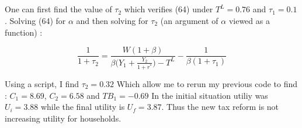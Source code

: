 \documentclass{article}
\begin{document}
\subsection{}
One can first find the value of $\tau_2$ which verifies (64) under $T^L = 0.76$ and $\tau_1 = 0.1$.
Solving (64) for $\alpha$ and then solving for $\tau_2$ (an argument of $\alpha$ viewed as a function) :

$$\frac{1}{1+\tau_2} = \frac{W(1+\beta)}{\beta \Big( Y_1 + \displaystyle \frac{Y_2}{1+r^*} \Big) - T^L} - \frac{1}{\beta(1+\tau_1)}$$

Using a script, I find $\tau_2 = 0.32$
Which allow me to rerun my previous code to find : $C_1 = 8.69$, $C_2 = 6.58$ and $TB_1 = -0.69$\newline
In the initial situation utiliy was $U_i = 3.88$ while the final utility is $U_f = 3.87$. Thus the new tax reform is not increasing utility for households.
\end{document}
